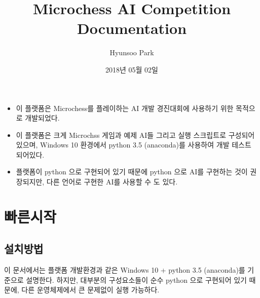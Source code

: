 \documentclass[letterpaper,10pt,english]{sphinxmanual}
\title{Microchess AI Competition Documentation}
\date{2018년 05월 02일}
\author{Hyunsoo Park}
\begin{document}
\maketitle
\sphinxtableofcontents
{}\label{\detokenize{index::doc}}

\begin{itemize}
\item {} 
이 플랫폼은 Microchess를 플레이하는 AI 개발 경진대회에 사용하기 위한 목적으로 개발되었다.

\item {} 
이 플랫폼은 크게 Microchss 게임과 예제 AI들 그리고 실행 스크립트로 구성되어 있으며, Windows 10 환경에서 python 3.5 (anaconda)를 사용하여 개발 테스트 되어있다.

\item {} 
플랫폼이 python 으로 구현되어 있기 때문에 python 으로 AI를 구현하는 것이 권장되지만, 다른 언어로 구현한 AI를 사용할 수 도 있다.

\end{itemize}


\chapter{빠른시작}
\label{\detokenize{index:chess-ai-compeitition-platform}}\label{\detokenize{index:id1}}

\section{설치방법}
\label{\detokenize{index:id2}}
이 문서에서는 플랫폼 개발환경과 같은 Windows 10 + python 3.5 (anaconda)를 기준으로 설명한다.
하지만, 대부분의 구성요소들이 순수 python 으로 구현되어 있기 때문에, 다른 운영체제에서 큰 문제없이 실행
가능하다.
\end{document}

